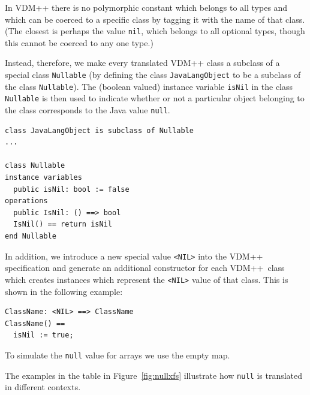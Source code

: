 \documentclass[\pformat,12pt]{article}
\newcommand{\VDM}{VDM++}
\begin{document}
In VDM++ there is no polymorphic constant which belongs to all types
and which can be coerced to a specific class by tagging it with the
name of that class. (The closest is perhaps the value \texttt{nil},
which belongs to all optional types, though this cannot be coerced to
any one type.)

Instead, therefore, we make every translated VDM++ class a
subclass of a special class \texttt{Nullable} (by defining the class
\texttt{JavaLangObject} to be a subclass of the class
\texttt{Nullable}). The (boolean valued) instance variable
\texttt{isNil} in the class \texttt{Nullable} is then used to indicate
whether or not a particular object belonging to the class corresponds
to the Java value \texttt{null}. 

\begin{small}
\begin{verbatim}
class JavaLangObject is subclass of Nullable
...

class Nullable
instance variables
  public isNil: bool := false
operations
  public IsNil: () ==> bool
  IsNil() == return isNil
end Nullable
\end{verbatim}
\end{small}

In addition, we introduce a new special value \texttt{<NIL>}
into the VDM++ specification and generate an additional constructor
for each \VDM\ class which creates instances which represent the
\texttt{<NIL>} value of that class. This is shown in the following
example: 

\begin{small}
\begin{verbatim}
ClassName: <NIL> ==> ClassName
ClassName() ==
  isNil := true;
\end{verbatim}
\end{small}


To simulate the \texttt{null} value for arrays we use the empty map. 

The examples in the table in Figure~\ref{fig:nullxfs} illustrate how
\texttt{null} is translated in different contexts.
\end{document}
